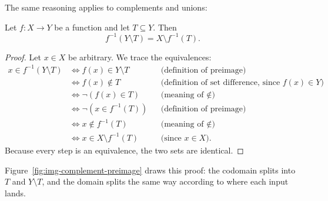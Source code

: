 The same reasoning applies to complements and unions:

\begin{theorem}
Let $f: X \to Y$ be a function and let $T \subseteq Y$. Then
\[
f^{-1}(Y \setminus T) = X \setminus f^{-1}(T).
\]
\end{theorem}

\begin{proof}
Let $x \in X$ be arbitrary. We trace the equivalences:
\begin{align*}
x \in f^{-1}(Y \setminus T) 
&\iff f(x) \in Y \setminus T && \text{(definition of preimage)} \\
&\iff f(x) \notin T && \text{(definition of set difference, since } f(x) \in Y \text{)} \\
&\iff \neg (f(x) \in T) && \text{(meaning of } \notin \text{)} \\
&\iff \neg (x \in f^{-1}(T)) && \text{(definition of preimage)} \\
&\iff x \notin f^{-1}(T) && \text{(meaning of } \notin \text{)} \\
&\iff x \in X \setminus f^{-1}(T) && \text{(since } x \in X \text{)}.
\end{align*}
Because every step is an equivalence, the two sets are identical.
\end{proof}

Figure~\ref{fig:img-complement-preimage} draws this proof: the codomain splits into $T$ and $Y \setminus T$, and the domain splits the same way according to where each input lands.

